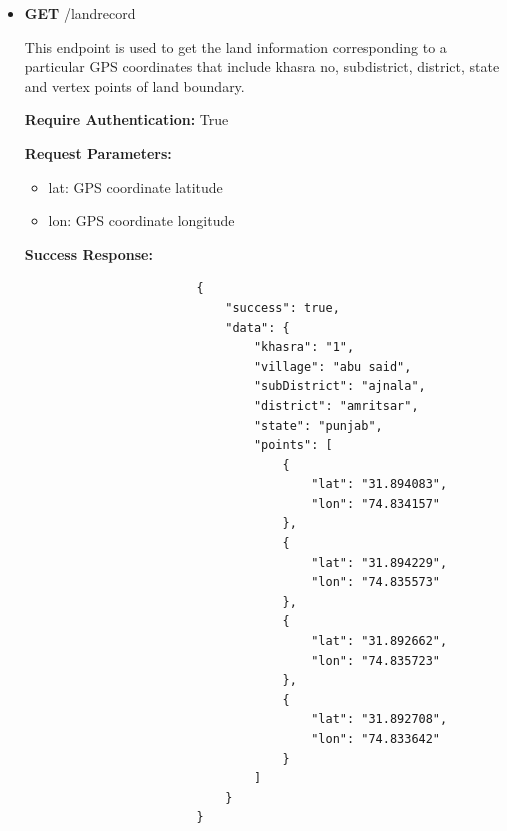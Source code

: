\documentclass[12pt]{article}
\begin{document}
\begin{itemize}
            \item \textbf{GET} /landrecord
                \begin{addmargin}[1em]{2em}%
                    This endpoint is used to get the land information corresponding to a particular GPS coordinates that include khasra no, subdistrict, district, state and vertex points of land boundary.
                    \par\textbf{Require Authentication:} True
                    \par\textbf{Request Parameters:}
                    \begin{itemize}
                        \item lat: GPS coordinate latitude
                        \item lon: GPS coordinate longitude
                    \end{itemize}
                    \par\textbf{Success Response:}
                    \begin{listing}[H]
                    \begin{verbatim}
                        {
                            "success": true,
                            "data": {
                                "khasra": "1",
                                "village": "abu said",
                                "subDistrict": "ajnala",
                                "district": "amritsar",
                                "state": "punjab",
                                "points": [
                                    {
                                        "lat": "31.894083",
                                        "lon": "74.834157"
                                    },
                                    {
                                        "lat": "31.894229",
                                        "lon": "74.835573"
                                    },
                                    {
                                        "lat": "31.892662",
                                        "lon": "74.835723"
                                    },
                                    {
                                        "lat": "31.892708",
                                        "lon": "74.833642"
                                    }
                                ]
                            }
                        }
                    \end{verbatim}
                   \end{listing}
                \end{addmargin}
           

\end{itemize}
\end{document}
